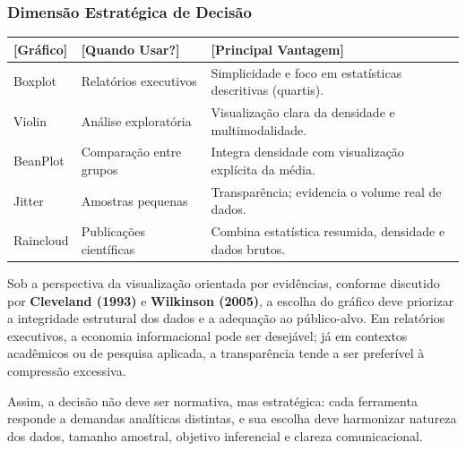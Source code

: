 \subsubsection{Dimensão Estratégica de Decisão}

\begin{center}
\small
\begin{tabularx}{\textwidth}{lX X}
\toprule
\textbf{[Gráfico]} & \textbf{[Quando Usar?]} & \textbf{[Principal Vantagem]} \\
\midrule
Boxplot   & Relatórios executivos & Simplicidade e foco em estatísticas descritivas (quartis). \\
\hline
Violin    & Análise exploratória  & Visualização clara da densidade e multimodalidade. \\
\hline
BeanPlot  & Comparação entre grupos & Integra densidade com visualização explícita da média. \\
\hline
Jitter    & Amostras pequenas & Transparência; evidencia o volume real de dados. \\
\hline
Raincloud & Publicações científicas & Combina estatística resumida, densidade e dados brutos. \\
\bottomrule
\end{tabularx}
\end{center}

Sob a perspectiva da visualização orientada por evidências, conforme discutido por \textbf{Cleveland (1993)} e \textbf{Wilkinson (2005)}, a escolha do gráfico deve priorizar a integridade estrutural dos dados e a adequação ao público-alvo. Em relatórios executivos, a economia informacional pode ser desejável; já em contextos acadêmicos ou de pesquisa aplicada, a transparência tende a ser preferível à compressão excessiva. \vskip0.3cm

Assim, a decisão não deve ser normativa, mas estratégica: cada ferramenta responde a demandas analíticas distintas, e sua escolha deve harmonizar natureza dos dados, tamanho amostral, objetivo inferencial e clareza comunicacional.